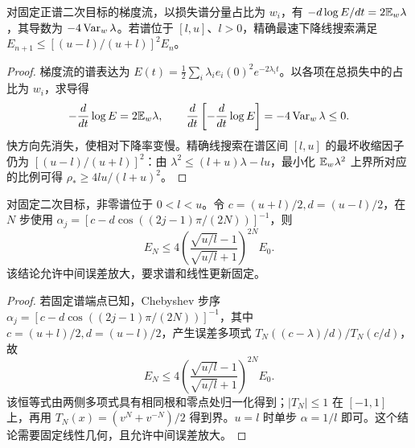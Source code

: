 \begin{proposition}[谱耗散与精确线搜索的速率]
对固定正谱二次目标的梯度流，以损失谱分量占比为 $w_i$，有 $-d\log E/dt=2\mathbb E_w\lambda$，其导数为 $-4\operatorname{Var}_w\lambda$。若谱位于 $[l,u]$、$l>0$，精确最速下降线搜索满足 $E_{n+1}\le[(u-l)/(u+l)]^2E_n$。
\end{proposition}
\begin{proof}
梯度流的谱表达为 $E(t)=\frac12\sum_i\lambda_ie_i(0)^2e^{-2\lambda_it}$。以各项在总损失中的占比为 $w_i$，求导得
\begin{equation}
-\frac d{dt}\log E=2\mathbb E_w\lambda,\qquad
\frac d{dt}\left[-\frac d{dt}\log E\right]=-4\operatorname{Var}_w\lambda\le0.
\end{equation}
快方向先消失，使相对下降率变慢。精确线搜索在谱区间 $[l,u]$ 的最坏收缩因子仍为 $[(u-l)/(u+l)]^2$：由 $\lambda^2\le(l+u)\lambda-lu$，最小化 $\mathbb E_w\lambda^2$ 上界所对应的比例可得 $\rho_*\ge4lu/(l+u)^2$。
\end{proof}

\begin{proposition}
对固定二次目标，非零谱位于 $0<l<u$。令 $c=(u+l)/2,d=(u-l)/2$，在 $N$ 步使用 $\alpha_j=[c-d\cos((2j-1)\pi/(2N))]^{-1}$，则
\begin{equation}
E_N\le4\left(\frac{\sqrt{u/l}-1}{\sqrt{u/l}+1}\right)^{2N}E_0.
\end{equation}
该结论允许中间误差放大，要求谱和线性更新固定。
\end{proposition}
\begin{proof}
若固定谱端点已知，Chebyshev 步序 $\alpha_j=[c-d\cos((2j-1)\pi/(2N))]^{-1}$，其中 $c=(u+l)/2,d=(u-l)/2$，产生误差多项式 $T_N((c-\lambda)/d)/T_N(c/d)$，故
\begin{equation}
E_N\le4\left(\frac{\sqrt{u/l}-1}{\sqrt{u/l}+1}\right)^{2N}E_0.
\end{equation}
该恒等式由两侧多项式具有相同根和零点处归一化得到；$|T_N|\le1$ 在 $[-1,1]$ 上，再用 $T_N(x)=(v^N+v^{-N})/2$ 得到界。$u=l$ 时单步 $\alpha=1/l$ 即可。这个结论需要固定线性几何，且允许中间误差放大。
\end{proof}

